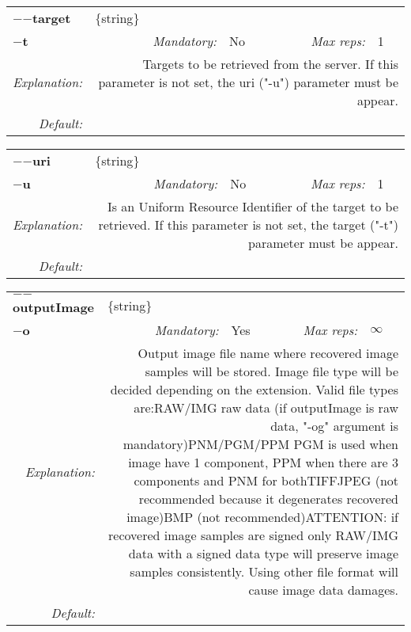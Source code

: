\begin{center}\begin{tabular}{|rr|rl|rl|}
\hline
\multicolumn{2}{|l|}{\textbf{$-$$-$target}} & \multicolumn{4}{|l|}{$\{$string$\}$} \\
\cline{3-6}
\multicolumn{2}{|l|}{\textbf{$-$t}} & \emph{Mandatory:} & No & \emph{Max reps:} & 1 \\
\hline
\emph{Explanation:} & \multicolumn{5}{|p{12cm}|}{Targets to be retrieved from the server. If this parameter is not set, the uri ("-u") parameter must be appear.} \\
\hline
\emph{Default:} & \multicolumn{5}{|p{12cm}|}{} \\
\hline
\end{tabular}\end{center}
\begin{center}\begin{tabular}{|rr|rl|rl|}
\hline
\multicolumn{2}{|l|}{\textbf{$-$$-$uri}} & \multicolumn{4}{|l|}{$\{$string$\}$} \\
\cline{3-6}
\multicolumn{2}{|l|}{\textbf{$-$u}} & \emph{Mandatory:} & No & \emph{Max reps:} & 1 \\
\hline
\emph{Explanation:} & \multicolumn{5}{|p{12cm}|}{Is an Uniform Resource Identifier of the target to be retrieved. If this parameter is not set, the target ("-t") parameter must be appear.} \\
\hline
\emph{Default:} & \multicolumn{5}{|p{12cm}|}{} \\
\hline
\end{tabular}\end{center}
\begin{center}\begin{tabular}{|rr|rl|rl|}
\hline
\multicolumn{2}{|l|}{\textbf{$-$$-$outputImage}} & \multicolumn{4}{|l|}{$\{$string$\}$} \\
\cline{3-6}
\multicolumn{2}{|l|}{\textbf{$-$o}} & \emph{Mandatory:} & Yes & \emph{Max reps:} & $\infty$ \\
\hline
\emph{Explanation:} & \multicolumn{5}{|p{12cm}|}{Output image file name where recovered image samples will be stored. Image file type will be decided depending on the extension. Valid file types are:\newline RAW/IMG raw data (if outputImage is raw data, "-og" argument is mandatory)\newline PNM/PGM/PPM PGM is used when image have 1 component, PPM when there are 3 components and PNM for both\newline TIFF\newline JPEG (not recommended because it degenerates recovered image)\newline BMP (not recommended)\newline ATTENTION: if recovered image samples are signed only RAW/IMG data with a signed data type will preserve image samples consistently. Using other file format will cause image data damages.} \\
\hline
\emph{Default:} & \multicolumn{5}{|p{12cm}|}{} \\
\hline
\end{tabular}\end{center}
